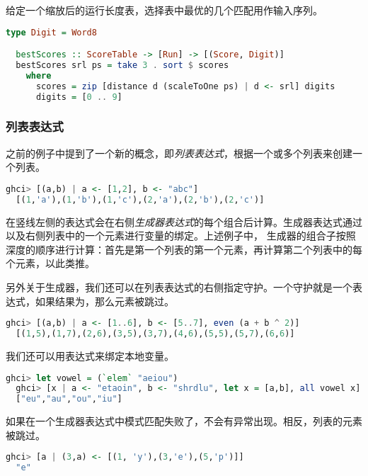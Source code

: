 \documentclass[./main.tex]{subfiles}
\begin{document}
给定一个缩放后的运行长度表，选择表中最优的几个匹配用作输入序列。

\begin{lstlisting}[language=Haskell]
  type Digit = Word8

  bestScores :: ScoreTable -> [Run] -> [(Score, Digit)]
  bestScores srl ps = take 3 . sort $ scores
    where
      scores = zip [distance d (scaleToOne ps) | d <- srl] digits
      digits = [0 .. 9]
\end{lstlisting}

\subsubsection*{列表表达式}

之前的例子中提到了一个新的概念，即\textit{列表表达式}，根据一个或多个列表来创建一个列表。

\begin{lstlisting}[language=Haskell]
  ghci> [(a,b) | a <- [1,2], b <- "abc"]
  [(1,'a'),(1,'b'),(1,'c'),(2,'a'),(2,'b'),(2,'c')]
\end{lstlisting}

在竖线左侧的表达式会在右侧\textit{生成器表达式}的每个组合后计算。生成器表达式通过以及右侧列表中的一个元素进行变量的绑定。上述例子中，
生成器的组合子按照深度的顺序进行计算：首先是第一个列表的第一个元素，再计算第二个列表中的每个元素，以此类推。

另外关于生成器，我们还可以在列表表达式的右侧指定守护。一个守护就是一个表达式，如果结果为，那么元素被跳过。

\begin{lstlisting}[language=Haskell]
  ghci> [(a,b) | a <- [1..6], b <- [5..7], even (a + b ^ 2)]
  [(1,5),(1,7),(2,6),(3,5),(3,7),(4,6),(5,5),(5,7),(6,6)]
\end{lstlisting}

我们还可以用表达式来绑定本地变量。

\begin{lstlisting}[language=Haskell]
  ghci> let vowel = (`elem` "aeiou")
  ghci> [x | a <- "etaoin", b <- "shrdlu", let x = [a,b], all vowel x]
  ["eu","au","ou","iu"]
\end{lstlisting}

如果在一个生成器表达式中模式匹配失败了，不会有异常出现。相反，列表的元素被跳过。

\begin{lstlisting}[language=Haskell]
  ghci> [a | (3,a) <- [(1, 'y'),(3,'e'),(5,'p')]]
  "e"
\end{lstlisting}
\end{document}

